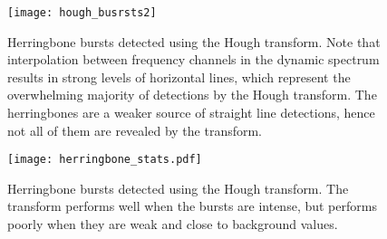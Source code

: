 %
%
\begin{figure}[t!]
\begin{center}
\texttt{[image: hough\_busrsts2]}
\caption[Hough transform herringbones]{Herringbone bursts detected using the Hough transform. Note that interpolation between frequency channels in the dynamic spectrum results in strong levels of horizontal lines, which represent the overwhelming majority of detections by the Hough transform. The herringbones are a weaker source of straight line detections, hence not all of them are revealed by the transform.}
\label{fig:hough_hb}
\end{center}
\end{figure}
%
%
\begin{figure}[t!]
\begin{center}
\texttt{[image: herringbone\_stats.pdf]}
\caption[Hough transform herringbones]{Herringbone bursts detected using the Hough transform. The transform performs well when the bursts are intense, but performs poorly when they are weak and close to background values.}
\label{fig:bibf}
\end{center}
\end{figure}


